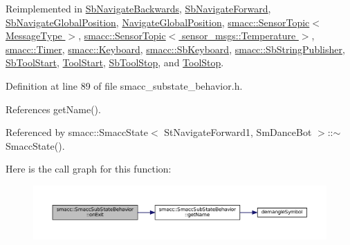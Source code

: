 Reimplemented in \hyperlink{classSbNavigateBackwards_afc23bccc5d951e064bd8a9283934e7ec}{Sb\+Navigate\+Backwards}, \hyperlink{classSbNavigateForward_ac16315240c9dd4e5e7f3681455f997cb}{Sb\+Navigate\+Forward}, \hyperlink{classSbNavigateGlobalPosition_a9a002dcd2bcc35d8f87f79d32e47fb3c}{Sb\+Navigate\+Global\+Position}, \hyperlink{classNavigateGlobalPosition_aa5e17638bdf3944631e81d901632bb72}{Navigate\+Global\+Position}, \hyperlink{classsmacc_1_1SensorTopic_a563d6288b66605ca99320eab5de9cfba}{smacc\+::\+Sensor\+Topic$<$ Message\+Type $>$}, \hyperlink{classsmacc_1_1SensorTopic_a563d6288b66605ca99320eab5de9cfba}{smacc\+::\+Sensor\+Topic$<$ sensor\+\_\+msgs\+::\+Temperature $>$}, \hyperlink{classsmacc_1_1Timer_a5984dee1815d8626f7728c08aa7c6278}{smacc\+::\+Timer}, \hyperlink{classsmacc_1_1Keyboard_a494dd2f35c5b1fb520b4f4cd4b61b6a9}{smacc\+::\+Keyboard}, \hyperlink{classsmacc_1_1SbKeyboard_adbfe63be296d5e93b51de80672ea36c5}{smacc\+::\+Sb\+Keyboard}, \hyperlink{classsmacc_1_1SbStringPublisher_a6e8de8b5d553092467ae980aa08ae576}{smacc\+::\+Sb\+String\+Publisher}, \hyperlink{classSbToolStart_ade7a5c2b52056ba0bb6c089c8d8b4949}{Sb\+Tool\+Start}, \hyperlink{classToolStart_ab258607079d47d3ef0da92c085020bd4}{Tool\+Start}, \hyperlink{classSbToolStop_a297d4c079bc5d8d06010dcf28cff98dc}{Sb\+Tool\+Stop}, and \hyperlink{classToolStop_a8c5028c3e7aa2de0b5b48793d38784b3}{Tool\+Stop}.



Definition at line 89 of file smacc\+\_\+substate\+\_\+behavior.\+h.



References get\+Name().



Referenced by smacc\+::\+Smacc\+State$<$ St\+Navigate\+Forward1, Sm\+Dance\+Bot $>$\+::$\sim$\+Smacc\+State().




Here is the call graph for this function\+:
\nopagebreak
\begin{figure}[H]
\begin{center}
\leavevmode
\includegraphics[width=350pt]{classsmacc_1_1SmaccSubStateBehavior_ab78b9de76c04a7ab6c16d5924e216ef9_cgraph}
\end{center}
\end{figure}




